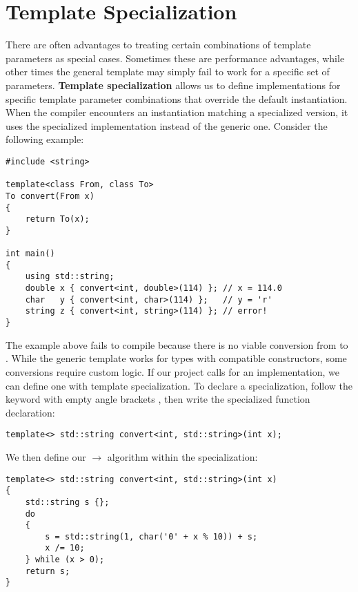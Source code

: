 \documentclass[12pt]{article}
\begin{document}
\section{Template Specialization}

\noindent
There are often advantages to treating certain combinations of template parameters as special cases.
Sometimes these are performance advantages, while other times the general template may simply fail to work for a specific set of parameters.
\textbf{Template specialization} allows us to define implementations for specific template parameter combinations that override the default instantiation.
When the compiler encounters an instantiation matching a specialized version, it uses the specialized implementation instead of the generic one.
Consider the following example:

\pagebreak

\begin{lstlisting}[style=cxx]
#include <string>

template<class From, class To>
To convert(From x)
{
    return To(x);
}

int main()
{
    using std::string;
    double x { convert<int, double>(114) }; // x = 114.0
    char   y { convert<int, char>(114) };   // y = 'r'
    string z { convert<int, string>(114) }; // error!
}
\end{lstlisting}

\noindent
The example above fails to compile because there is no viable conversion from  to .
While the generic template works for types with compatible constructors, some conversions require custom logic.
If our project calls for an implementation, we can define one with template specialization.
To declare a specialization, follow the  keyword with empty angle brackets \inlinecxx{<>}, then write the specialized function declaration:

\begin{lstlisting}[style=cxx]
template<> std::string convert<int, std::string>(int x);
\end{lstlisting}

\noindent
We then define our  $\rightarrow$  algorithm within the specialization:

\begin{lstlisting}[style=cxx]
template<> std::string convert<int, std::string>(int x)
{
    std::string s {};
    do
    {
        s = std::string(1, char('0' + x % 10)) + s;
        x /= 10;
    } while (x > 0);
    return s;
}
\end{lstlisting}
\end{document}
